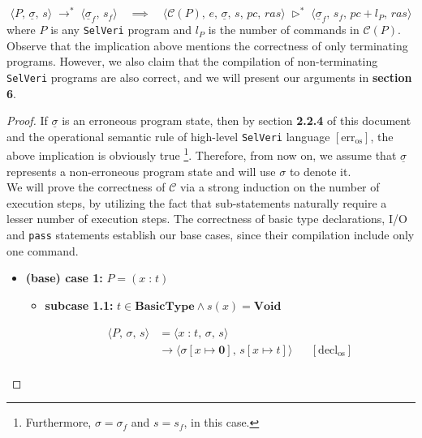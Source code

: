 \documentclass{article}
\begin{document}
\[
\langle P,\, \underline{\sigma},\, s \rangle \; \rightarrow^{\ast} \; \langle \underline{\sigma}_f,\, s_f \rangle \quad \implies \quad 
\langle \mathcal{C}(P),\, e,\, \underline{\sigma},\, s,\, pc,\, ras \rangle \; \triangleright^{\ast} \; \langle \underline{\sigma}_f,\, s_f,\, pc + l_P,\, ras \rangle 
\] where $P$ is any \texttt{SelVeri} program and $l_P$ is the number of commands in $\mathcal{C}(P)$. \\

Observe that the implication above mentions the correctness of only terminating programs. However, we also claim that the compilation of non-terminating \texttt{SelVeri} programs are also correct, and we will present our arguments in \textbf{section 6}.

\begin{proof}
If $\underline{\sigma}$ is an erroneous program state, then by section \textbf{2.2.4} of this document and the operational semantic rule of high-level \texttt{SelVeri} language $[ \text{err}_{\text{os}} ]$, the above implication is obviously true \footnote{Furthermore, $\sigma = \sigma_f$ and $s = s_f$, in this case.}.  Therefore, from now on, we assume that $\underline{\sigma}$ represents a non-erroneous program state and will use $\sigma$ to denote it. \\

We will prove the correctness of $\mathcal{C}$ via a strong induction on the number of execution steps, by utilizing the fact that sub-statements naturally require a lesser number of execution steps. The correctness of basic type declarations, I/O and \texttt{pass} statements establish our base cases, since their compilation include only one command.


\begin{itemize}
    \item \textbf{(base) case 1:} $P = (x \;\texttt{:}\; t)$

        \begin{itemize}
            \item \textbf{subcase 1.1:} $t \in \textbf{BasicType} \land s(x) = \textbf{Void}$

            \[
              \begin{aligned}
              \langle P,\, \sigma,\, s \rangle
              &=\langle x \;\texttt{:}\; t,\, \sigma,\, s \rangle \\
              &\rightarrow \langle \sigma[x \mapsto \textbf{0}] ,\, s[x \mapsto t] \rangle
              && [ \text{decl}_{\text{os}} ] \\   
              \end{aligned}
          \]
          

\end{itemize}
\end{itemize}
\end{proof}
\end{document}
